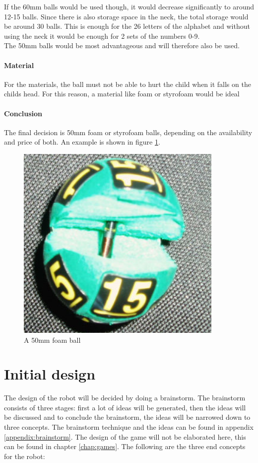 \documentclass[11pt,twoside,a4paper]{report}
\begin{document}
If the 60mm balls would be used though, it would decrease significantly to around 12-15 balls. 
Since there is also storage space in the neck, the total storage would be around 30 balls. This is enough for the 26 letters of the alphabet and without using the neck it would be enough for 2 sets of the numbers 0-9. \\
The 50mm balls would be most advantageous and will therefore also be used. 
\subsubsection{Material}
For the materials, the ball must not be able to hurt the child when it falls on the childs head. For this reason, a material like foam or styrofoam would be ideal 
\newpage
\subsubsection{Conclusion}
The final decision is 50mm foam or styrofoam balls, depending on the availability and price of both. An example is shown in figure \ref{figure:lotteryball}.
\begin{figure}[H]
\begin{center}
\includegraphics[width=10cm]{Images/LOTTERY-BALLS-with-rfid.jpg}
\end{center}
\caption{A 50mm foam ball}
\label{figure:lotteryball}
\end{figure}
\chapter{Initial design}
The design of the robot will be decided by doing a brainstorm. The brainstorm consists of three stages: first a lot of ideas will be generated, then the ideas will be discussed and to conclude the brainstorm, the ideas will be narrowed down to three concepts. The brainstorm technique and the ideas can be found in appendix \ref{appendix:brainstorm}. The design of the game will not be elaborated here, this can be found in chapter \ref{chap:games}. The following are the three end concepts for the robot:
\end{document}
